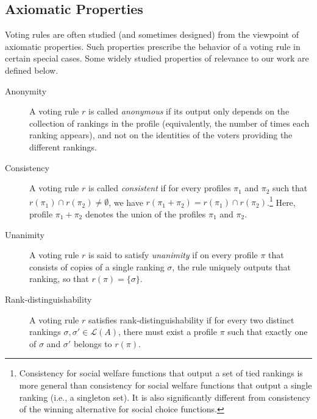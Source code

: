 \documentclass[prodmode,acmec]{ec-acmsmall}
\newcommand{\calL}{{\mathcal{L}}}
\newcommand{\rank}{{\calL(A)}}
\begin{document}
\subsection*{Axiomatic Properties} Voting rules are often studied (and sometimes designed) from the viewpoint of axiomatic properties. Such properties prescribe the behavior of a voting rule in certain special cases. Some widely studied properties of relevance to our work are defined below. 

\begin{description}
\item[Anonymity] A voting rule $r$ is called \emph{anonymous} if its output only depends on the collection of rankings in the profile (equivalently, the number of times each ranking appears), and not on the identities of the voters providing the different rankings. \\ %

\item[Consistency] A voting rule $r$ is called \emph{consistent} if for every profiles $\pi_1$ and $\pi_2$ such that $r(\pi_1) \cap r(\pi_2) \neq \emptyset$, we have $r(\pi_1+\pi_2) = r(\pi_1) \cap r(\pi_2)$.\footnote{Consistency for social welfare functions that output a set of tied rankings is more general than consistency for social welfare functions that output a single ranking (i.e., a singleton set). It is also significantly different from consistency of the winning alternative for social choice functions.} Here, profile $\pi_1+\pi_2$ denotes the union of the profiles $\pi_1$ and $\pi_2$. \\ %

\item[Unanimity] A voting rule $r$ is said to satisfy \emph{unanimity} if on every profile $\pi$ that consists of copies of a single ranking $\sigma$, the rule uniquely outputs that ranking, so that $r(\pi) = \{\sigma\}$.\\ %

\item[Rank-distinguishability] A voting rule $r$ satisfies rank-distinguishability if for every two distinct rankings $\sigma, \sigma' \in \rank$, there must exist a profile $\pi$ such that exactly one of $\sigma$ and $\sigma'$ belongs to $r(\pi)$. 
\end{description}
\end{document}
